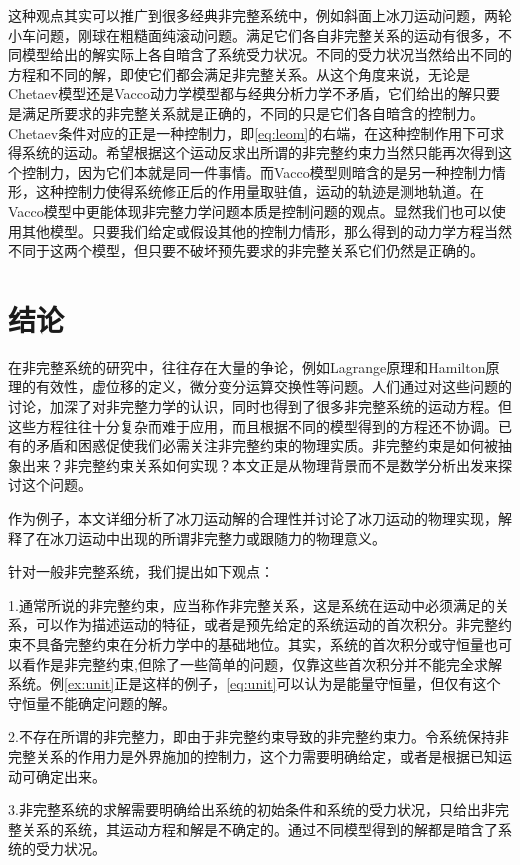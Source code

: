 \documentclass[A4,twoside]{ctexart}
\begin{document}
这种观点其实可以推广到很多经典非完整系统中，例如斜面上冰刀运动问题，两轮小车问题，刚球在粗糙面纯滚动问题。满足它们各自非完整关系的运动有很多，不同模型给出的解实际上各自暗含了系统受力状况。不同的受力状况当然给出不同的方程和不同的解，即使它们都会满足非完整关系。从这个角度来说，无论是Chetaev模型还是Vacco动力学模型都与经典分析力学不矛盾，它们给出的解只要是满足所要求的非完整关系就是正确的，不同的只是它们各自暗含的控制力。Chetaev条件对应的正是一种控制力，即\eqref{eq:leom}的右端，在这种控制作用下可求得系统的运动。希望根据这个运动反求出所谓的非完整约束力当然只能再次得到这个控制力，因为它们本就是同一件事情。而Vacco模型则暗含的是另一种控制力情形，这种控制力使得系统修正后的作用量取驻值，运动的轨迹是测地轨道。在Vacco模型中更能体现非完整力学问题本质是控制问题的观点。显然我们也可以使用其他模型。只要我们给定或假设其他的控制力情形，那么得到的动力学方程当然不同于这两个模型，但只要不破坏预先要求的非完整关系它们仍然是正确的。


\section{结论}
\label{sec:conclusion}

在非完整系统的研究中，往往存在大量的争论，例如Lagrange原理和Hamilton原理的有效性，虚位移的定义，微分变分运算交换性等问题。人们通过对这些问题的讨论，加深了对非完整力学的认识，同时也得到了很多非完整系统的运动方程。但这些方程往往十分复杂而难于应用，而且根据不同的模型得到的方程还不协调。已有的矛盾和困惑促使我们必需关注非完整约束的物理实质。非完整约束是如何被抽象出来？非完整约束关系如何实现？本文正是从物理背景而不是数学分析出发来探讨这个问题。

作为例子，本文详细分析了冰刀运动解的合理性并讨论了冰刀运动的物理实现，解释了在冰刀运动中出现的所谓非完整力或跟随力的物理意义。

针对一般非完整系统，我们提出如下观点：

1.通常所说的非完整约束，应当称作非完整关系，这是系统在运动中必须满足的关系，可以作为描述运动的特征，或者是预先给定的系统运动的首次积分。非完整约束不具备完整约束在分析力学中的基础地位。其实，系统的首次积分或守恒量也可以看作是非完整约束,但除了一些简单的问题，仅靠这些首次积分并不能完全求解系统。例\ref{ex:unit}正是这样的例子，\eqref{eq:unit}可以认为是能量守恒量，但仅有这个守恒量不能确定问题的解。

2.不存在所谓的非完整力，即由于非完整约束导致的非完整约束力。令系统保持非完整关系的作用力是外界施加的控制力，这个力需要明确给定，或者是根据已知运动可确定出来。

3.非完整系统的求解需要明确给出系统的初始条件和系统的受力状况，只给出非完整关系的系统，其运动方程和解是不确定的。通过不同模型得到的解都是暗含了系统的受力状况。
\end{document}
